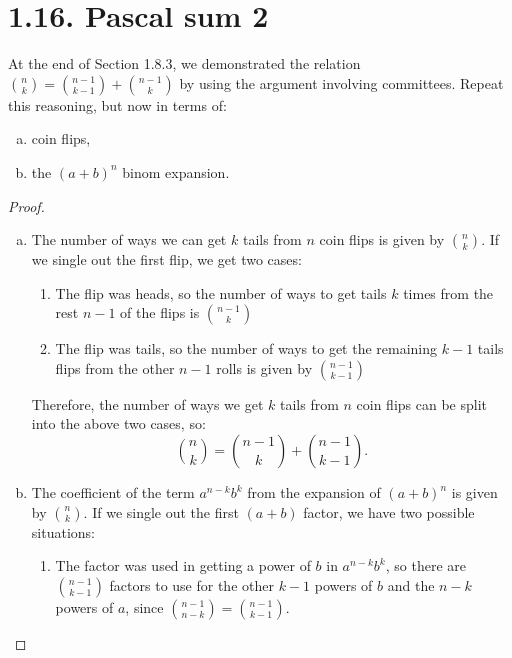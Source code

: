 \section*{1.16. Pascal sum 2}
At the end of Section 1.8.3, we demonstrated the relation 
$\binom{n}{k} = \binom{n - 1}{k - 1} + \binom{n - 1}{k}$
by using the argument involving committees. Repeat this reasoning,
but now in terms of:
\begin{enumerate}[(a)]
    \item coin flips,
    \item the $(a + b)^n$ binom expansion.
\end{enumerate}

\vspace{2em}

\begin{proof}
    \hfill
    \begin{enumerate}[(a)]
        \item The number of ways we can get $k$ tails from $n$ coin flips is given by 
            $\binom{n}{k}$. If we single out the first flip, we get two cases:
            \begin{enumerate}[(1)]
                \item The flip was heads, so the number of ways to get tails $k$ times
                    from the rest $n - 1$ of the flips is $\binom{n - 1}{k}$

                \item The flip was tails, so the number of ways to get the remaining 
                    $k - 1$ tails flips from the other $n - 1$ rolls is given by $\binom{n - 1}{k - 1}$
            \end{enumerate}

        Therefore, the number of ways we get $k$ tails from $n$ coin flips can be split into the above
        two cases, so:
        \[
            \binom{n}{k} = \binom{n - 1}{k} + \binom{n - 1}{k - 1}
        .\] 

    \item The coefficient of the term $a^{n - k}b^k$ from the expansion of $(a + b)^n$ is given by 
        $\binom{n}{k}$. If we single out the first $(a + b)$ factor, we have two possible situations:
        \begin{enumerate}
            \item The factor was used in getting a power of $b$ in $a^{n - k}b^k$, so there are 
                $\binom{n - 1}{k - 1}$ factors to use for the other $k - 1$ powers of $b$ and the $n - k$ 
                powers of $a$, since 
                $\binom{n - 1}{n - k} = \binom{n - 1}{k - 1}$.


\end{enumerate}
\end{enumerate}
\end{proof}
